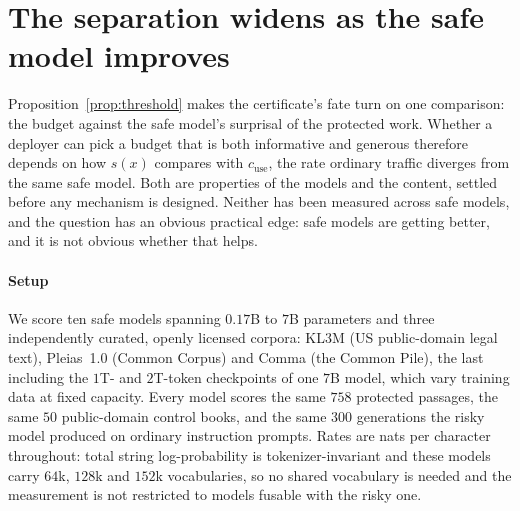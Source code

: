 
\section{The separation widens as the safe model improves}\label{sec:scaling}

Proposition~\ref{prop:threshold} makes the certificate's fate turn on one comparison: the budget
against the safe model's surprisal of the protected work. Whether a deployer can pick a budget that
is both informative and generous therefore depends on how $s(x)$ compares with $c_{\mathrm{use}}$,
the rate ordinary traffic diverges from the same safe model. Both are properties of the models and
the content, settled before any mechanism is designed. Neither has been measured across safe models,
and the question has an obvious practical edge: safe models are getting better, and it is not
obvious whether that helps.

\paragraph{Setup}
We score ten safe models spanning $0.17$B to $7$B parameters and three independently curated,
openly licensed corpora: KL3M (US public-domain legal text), Pleias~1.0 (Common Corpus) and Comma
(the Common Pile), the last including the $1$T- and $2$T-token checkpoints of one $7$B model, which
vary training data at fixed capacity. Every model scores the same $758$ protected passages, the
same $50$ public-domain control books, and the same $300$ generations the risky model produced on
ordinary instruction prompts. Rates are nats per character throughout: total string log-probability
is tokenizer-invariant and these models carry $64$k, $128$k and $152$k vocabularies, so no shared
vocabulary is needed and the measurement is not restricted to models fusable with the risky one.

